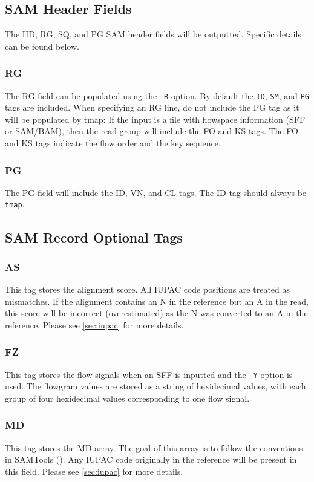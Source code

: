 \documentclass[a4paper,12pt]{book}
\newcommand{\TT}[1]{{\tt #1}} %
\begin{document}
\subsection{SAM Header Fields}

The HD, RG, SQ, and PG SAM header fields will be outputted.
Specific details can be found below.

\subsubsection{RG}
The RG field can be populated using the \TT{-R} option.
By default the \TT{ID}, \TT{SM}, and \TT{PG} tags are included.
When specifying an RG line, do not include the PG tag as it will be populated by tmap:
If the input is a file with flowspace information (SFF or SAM/BAM), then the read group will include the FO and KS tags.
The FO and KS tags indicate the flow order and the key sequence.

\subsubsection{PG}
The PG field will include the ID, VN, and CL tags.
The ID tag should always be \TT{tmap}.

\subsection{SAM Record Optional Tags}

\subsubsection{AS}
This tag stores the alignment score.
All IUPAC code positions are treated as mismatches.
If the alignment contains an N in the reference but an A in the read, this score will be incorrect (overestimated) as the N was converted to an A in the reference.
Please see \autoref{sec:iupac} for more details. 

\subsubsection{FZ}
This tag stores the flow signals when an SFF is inputted and the \TT{-Y} option is used.
The flowgram values are stored as a string of hexidecimal values, with each group of four hexidecimal values corresponding to one flow signal.

\subsubsection{MD}
This tag stores the MD array.
The goal of this array is to follow the conventions in SAMTools (\cite{SAM-format}).
Any IUPAC code originally in the reference will be present in this field.
Please see \autoref{sec:iupac} for more details. 
\end{document}
